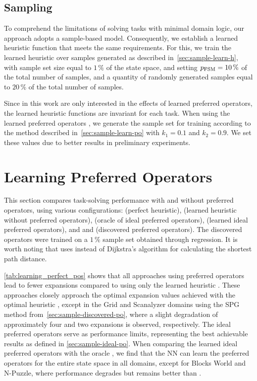 \documentclass[ppgc,diss,english]{iiufrgs}
\begin{document}
\subsection{Sampling}
\label{sec:exp-sampling}
To comprehend the limitations of solving tasks with minimal domain logic, our approach adopts a sample-based model. Consequently, we establish a learned heuristic function that meets the same requirements.
For this, we train the learned heuristic \hnn over samples generated as described in~\cref{sec:sample-learn-h}, with sample set size equal to $1\,\%$ of the state space, and setting $p_{\text{FSM}}=10\,\%$ of the total number of samples, and a quantity of randomly generated samples equal to $20\,\%$ of the total number of samples.

Since in this work are only interested in the effects of learned preferred operators, the learned heuristic functions are invariant for each task. When using the learned preferred operators \pog, we generate the sample set for training according to the method described in~\cref{sec:sample-learn-po} with $k_1 = 0.1$ and $k_2 = 0.9$. We set these values due to better results in preliminary experiments.

\section{Learning Preferred Operators}
\label{sec:exp-learning-po}
This section compares task-solving performance with and without preferred operators, using various configurations: \hstar (perfect heuristic), \hnn (learned heuristic without preferred operators), \postartable (oracle of ideal preferred operators), \postar (learned ideal preferred operators), and \pogstar and \pog (discovered preferred operators). The discovered operators were trained on a $1\,\%$ sample set obtained through regression. It is worth noting that \pogstar uses \hstar instead of Dijkstra's algorithm for calculating the shortest path distance.



\cref{tab:learning_perfect_pos} shows that all approaches using preferred operators lead to fewer expansions compared to using only the learned heuristic \hnn. These approaches closely approach the optimal expansion values achieved with the optimal heuristic \hstar, except in the Grid and Scanalyzer domains using the SPG method from~\cref{sec:sample-discovered-po}, where a slight degradation of approximately four and two expansions is observed, respectively. The ideal preferred operators serve as performance limits, representing the best achievable results as defined in \cref{sec:sample-ideal-po}. When comparing the learned ideal preferred operators \postar with the oracle \postartable, we find that the NN can learn the preferred operators for the entire state space in all domains, except for Blocks World and N-Puzzle, where performance degrades but remains better than \hnn.
\end{document}
